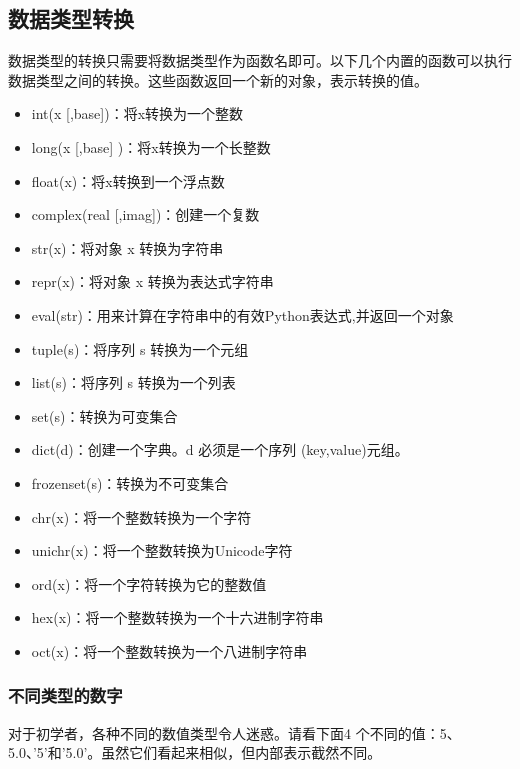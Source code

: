 \subsection{数据类型转换}
数据类型的转换只需要将数据类型作为函数名即可。以下几个内置的函数可以执行数据类型之间的转换。这些函数返回一个新的对象，表示转换的值。
\begin{itemize}
\item int(x [,base])：将x转换为一个整数

\item long(x [,base] )：将x转换为一个长整数

\item float(x)：将x转换到一个浮点数

\item complex(real [,imag])：创建一个复数

\item str(x)：将对象 x 转换为字符串

\item repr(x)：将对象 x 转换为表达式字符串

\item eval(str)：用来计算在字符串中的有效Python表达式,并返回一个对象

\item tuple(s)：将序列 s 转换为一个元组

\item list(s)：将序列 s 转换为一个列表

\item set(s)：转换为可变集合

\item dict(d)：创建一个字典。d 必须是一个序列 (key,value)元组。

\item frozenset(s)：转换为不可变集合

\item chr(x)：将一个整数转换为一个字符

\item unichr(x)：将一个整数转换为Unicode字符

\item ord(x)：将一个字符转换为它的整数值

\item hex(x)：将一个整数转换为一个十六进制字符串

\item oct(x)：将一个整数转换为一个八进制字符串
\end{itemize}



\subsubsection{不同类型的数字}
对于初学者，各种不同的数值类型令人迷惑。请看下面4 个不同的值：5、5.0、'5'和'5.0'。虽然它们看起来相似，但内部表示截然不同。

